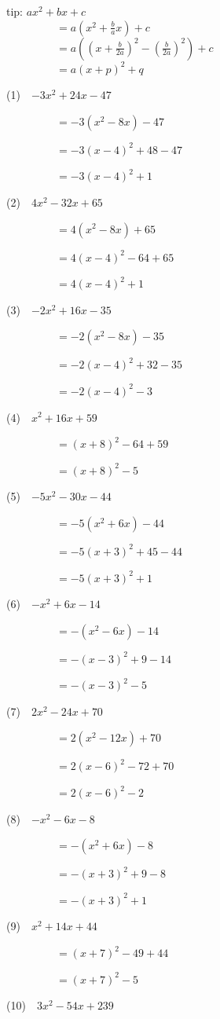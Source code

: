 \documentclass[a4j,twocolumn,10pt,fleqn]{jarticle}
\begin{document}
tip: $ax^2 + bx + c$\\ 
~~~~~~~~~$= a(x^2 + \frac{b}{a}x) + c$\\ 
~~~~~~~~~$= a\left((x + \frac{b}{2a})^2 - \left(\frac{b}{2a}\right)^2 \right)+ c$\\ 
~~~~~~~~~$= a(x + p)^2 + q$


(1)~~$-3x^2 +24x-47$

~~~~~~~~~$=-3(x^2-8x)-47$

~~~~~~~~~$=-3(x-4)^2 +48-47$

~~~~~~~~~$=-3(x-4)^2 +1$

(2)~~$4x^2-32x +65$

~~~~~~~~~$=4(x^2-8x) +65$

~~~~~~~~~$=4(x-4)^2-64+65$

~~~~~~~~~$=4(x-4)^2 +1$

(3)~~$-2x^2 +16x-35$

~~~~~~~~~$=-2(x^2-8x)-35$

~~~~~~~~~$=-2(x-4)^2 +32-35$

~~~~~~~~~$=-2(x-4)^2-3$

(4)~~$x^2 +16x +59$

~~~~~~~~~$=(x +8)^2 -64+59$

~~~~~~~~~$=(x +8)^2-5$

(5)~~$-5x^2-30x-44$

~~~~~~~~~$=-5(x^2 +6x)-44$

~~~~~~~~~$=-5(x +3)^2 +45-44$

~~~~~~~~~$=-5(x +3)^2 +1$

(6)~~$-x^2 +6x-14$

~~~~~~~~~$=-(x^2-6x)-14$

~~~~~~~~~$=-(x-3)^2 +9-14$

~~~~~~~~~$=-(x-3)^2-5$

(7)~~$2x^2-24x +70$

~~~~~~~~~$=2(x^2-12x) +70$

~~~~~~~~~$=2(x-6)^2-72+70$

~~~~~~~~~$=2(x-6)^2-2$

(8)~~$-x^2-6x-8$

~~~~~~~~~$=-(x^2 +6x)-8$

~~~~~~~~~$=-(x +3)^2 +9-8$

~~~~~~~~~$=-(x +3)^2 +1$

(9)~~$x^2 +14x +44$

~~~~~~~~~$=(x +7)^2 -49+44$

~~~~~~~~~$=(x +7)^2-5$

(10)~~$3x^2-54x +239$
\end{document}
